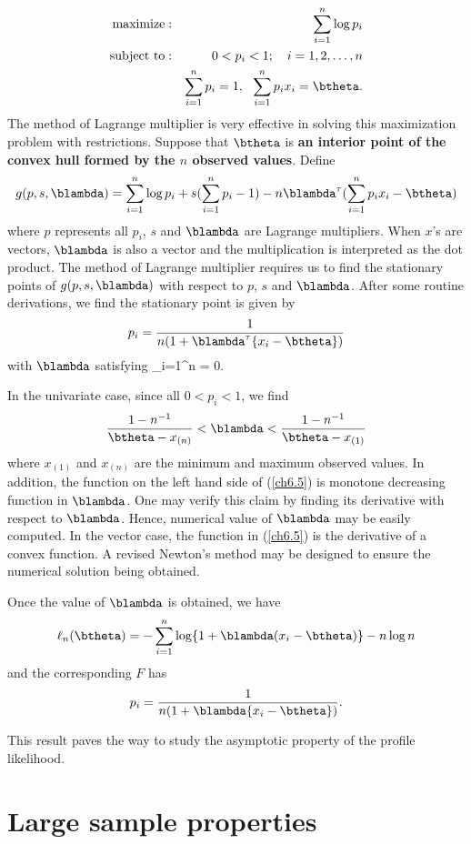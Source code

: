 \begin{eqnarray*}
\mbox{maximize}: &&\sum_{i=1}^n \log p_i\\
\mbox{subject to}: && 0 < p_i < 1; ~~~i=1, 2, \ldots, n\\
				&&\sum_{i=1}^n p_i = 1, ~~\sum_{i=1}^n p_i x_i = \btheta.
\end{eqnarray*}
The  method of Lagrange multiplier is very effective in solving this maximization problem 
with restrictions. 
Suppose that $\btheta$ is 
{\bf an interior point of the convex hull formed by the $n$ observed values}. 
Define 
\[
g(p, s, \blambda) 
= \sum_{i=1}^n \log p_i + s(\sum_{i=1}^n p_i - 1) -n \blambda^\tau (\sum_{i=1}^n p_i x_i - \btheta)
\]
where $p$ represents all $p_i$,
$s$ and $\blambda$ are Lagrange multipliers. When $x$'s are vectors, 
$\blambda$ is also a vector and the multiplication is interpreted as the dot product.
The method of Lagrange multiplier requires us to find the stationary points of $g(p, s, \blambda)$ 
with respect to $p$, $s$ and $\blambda$. 
After some routine derivations, we find the stationary point is given by
\[
p_i = \frac{1}{n(1 + \blambda^\tau \{x_i - \btheta\})}
\]
with $\blambda$ satisfying
\be
\sum_{i=1}^n  = 0.
\label{ch6.5}
\ee

In the univariate case, since all $0 < p_i < 1$, we find
\[
 \frac{1 - n^{-1}}{\btheta - x_{(n)} }< \blambda < \frac{1 - n^{-1}}{\btheta - x_{(1)}}
 \]
where $x_{(1)}$ and $x_{(n)}$ are the minimum and maximum observed values. 
In addition, the function on the left hand side of (\ref{ch6.5}) is monotone
decreasing function in $\blambda$. One may verify this claim by finding its
derivative with respect to $\blambda$.
Hence, numerical value of $\blambda$ may be easily computed.
In the vector case, the function in (\ref{ch6.5}) is the derivative of a convex function. 
A revised Newton's method may be designed to ensure the numerical 
solution being obtained.

Once the value of $\blambda$ is obtained, we have
\[
\ell_n(\btheta) = - \sum_{i=1}^n \log \{ 1 + \blambda ( x_i - \btheta) \} - n \log n
\]
and the corresponding $F$ has
\[
p_i = \frac{1}{n(1 + \blambda\{x_i - \btheta\})}.
\]

This result paves the way to study the asymptotic property of the
profile likelihood.

\section{Large sample properties}

